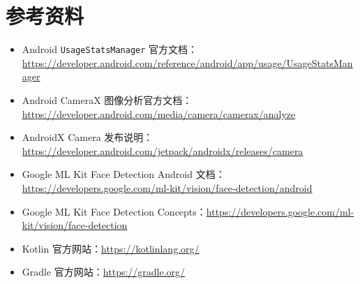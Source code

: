\documentclass[UTF8,a4paper,11pt]{ctexart}
\begin{document}
\section{参考资料}

\begin{itemize}
  \item Android \texttt{UsageStatsManager} 官方文档：\url{https://developer.android.com/reference/android/app/usage/UsageStatsManager}
  \item Android CameraX 图像分析官方文档：\url{https://developer.android.com/media/camera/camerax/analyze}
  \item AndroidX Camera 发布说明：\url{https://developer.android.com/jetpack/androidx/releases/camera}
  \item Google ML Kit Face Detection Android 文档：\url{https://developers.google.com/ml-kit/vision/face-detection/android}
  \item Google ML Kit Face Detection Concepts：\url{https://developers.google.com/ml-kit/vision/face-detection}
  \item Kotlin 官方网站：\url{https://kotlinlang.org/}
  \item Gradle 官方网站：\url{https://gradle.org/}
\end{itemize}
\end{document}

